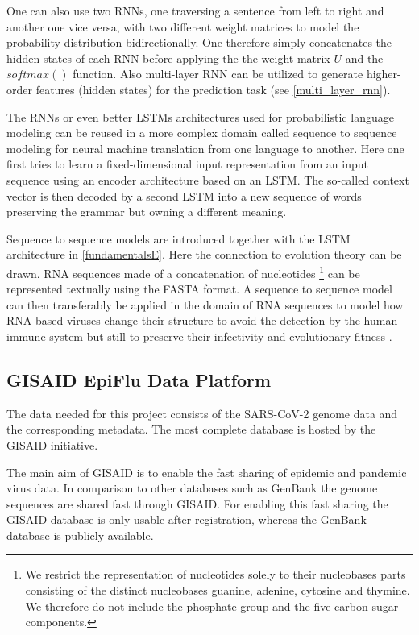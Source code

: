 One can also use two \acp{RNN}, one traversing a sentence from left to right and another one vice versa, with two different weight matrices to model the probability distribution bidirectionally. One therefore simply concatenates the hidden states of each \ac{RNN} before applying the the weight matrix $U$ and the $softmax()$ function. Also multi-layer \acs{RNN} can be utilized to generate higher-order features (hidden states) for the prediction task (see \autoref{multi_layer_rnn}). \cite{Gertz2020}

The \acp{RNN} or even better \acp{LSTM} architectures used for probabilistic language modeling can be reused in a more complex domain called sequence to sequence modeling for neural machine translation from one language to another. Here one first tries to learn a fixed-dimensional input representation from an input sequence using an encoder architecture based on an \ac{LSTM}. The so-called context vector is then decoded by a second \ac{LSTM} into a new sequence of words preserving the grammar but owning a different meaning. \cite{Sutskever2014}

Sequence to sequence models are introduced together with the \ac{LSTM} architecture in \autoref{fundamentalsE}. Here the connection to evolution theory can be drawn. \ac{RNA} sequences made of a concatenation of nucleotides \footnote{We restrict the representation of nucleotides solely to their nucleobases parts consisting of the distinct nucleobases guanine, adenine, cytosine and thymine. We therefore do not include the phosphate group and the five-carbon sugar components.} can be represented textually using the FASTA format. A sequence to sequence model can then transferably be applied in the domain of \ac{RNA} sequences to model how \ac{RNA}-based viruses change their structure to avoid the detection by the human immune system but still to preserve their infectivity and evolutionary fitness \cite{Hie2021}. 

\subsection{GISAID EpiFlu Data Platform} \label{fundamentalsB}

The data needed for this project consists of the \ac{SARS-CoV-2} genome data and the corresponding metadata. The most complete database is hosted by the \ac{GISAID} initiative. \cite{Gisaid2021}

The main aim of \ac{GISAID} is to enable the fast sharing of epidemic and pandemic virus data. In comparison to other databases such as GenBank the genome sequences are shared fast through \ac{GISAID}. For enabling this fast sharing the \ac{GISAID} database is only usable after registration, whereas the GenBank database is publicly available. \cite{shuGISAIDGlobalInitiative2017}

